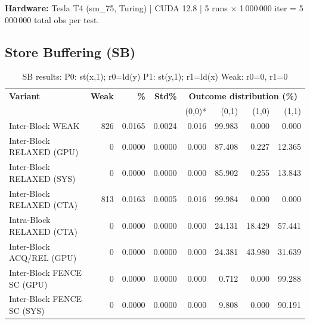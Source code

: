 \documentclass[a4paper]{article}
\begin{document}
\textbf{Hardware:} Tesla T4 (sm\_75, Turing) | CUDA 12.8 | 5 runs $\times$ 1\,000\,000 iter = 5\,000\,000 total obs per test.

\subsection{Store Buffering (SB)}

\begin{table}[H]
\centering
\small
\caption{SB results: P0: st(x,1); r0=ld(y) \quad P1: st(y,1); r1=ld(x) \quad Weak: r0=0, r1=0}
\label{tab:sb-results}
\begin{tabular}{l|r r r | r r r r}
\toprule
\textbf{Variant} & \textbf{Weak} & \textbf{\%} & \textbf{Std\%} & \multicolumn{4}{c}{\textbf{Outcome distribution (\%)}} \\
                 &               &             &                & (0,0)* & (0,1) & (1,0) & (1,1) \\
\midrule
Inter-Block WEAK          &   826 & 0.0165 & 0.0024 & 0.016 & 99.983 & 0.000 & 0.000 \\
Inter-Block RELAXED (GPU) &     0 & 0.0000 & 0.0000 & 0.000 & 87.408 & 0.227 & 12.365 \\
Inter-Block RELAXED (SYS) &     0 & 0.0000 & 0.0000 & 0.000 & 85.902 & 0.255 & 13.843 \\
Inter-Block RELAXED (CTA) &   813 & 0.0163 & 0.0005 & 0.016 & 99.984 & 0.000 & 0.000 \\
Intra-Block RELAXED (CTA) &     0 & 0.0000 & 0.0000 & 0.000 & 24.131 & 18.429 & 57.441 \\
Inter-Block ACQ/REL (GPU) &     0 & 0.0000 & 0.0000 & 0.000 & 24.381 & 43.980 & 31.639 \\
Inter-Block FENCE SC (GPU)&     0 & 0.0000 & 0.0000 & 0.000 &  0.712 &  0.000 & 99.288 \\
Inter-Block FENCE SC (SYS)&     0 & 0.0000 & 0.0000 & 0.000 &  9.808 &  0.000 & 90.191 \\
\bottomrule
\end{tabular}
\end{table}
\end{document}
